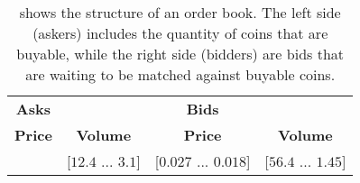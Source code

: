 \begin{table}[ht]
    \centering
    \begin{tabular}{c c| c c}
        \hline
         \textbf{Asks} & & \textbf{Bids} & \\
         \textbf{Price} & \textbf{Volume} & \textbf{Price} & \textbf{Volume}\\
         \hline
         [$0.028$ ... $0.14$] & [$12.4$ ... $3.1$] & [$0.027$ ... $0.018$] & [$56.4$ ... $1.45$]\\
         \hline
    \end{tabular}
    \caption[Structure - Order book]{shows the structure of an order book. The left side (askers) includes the quantity of coins that are buyable, while the right side (bidders) are bids that are waiting to be matched against buyable coins. }
    \label{tab:order_book}
\end{table}